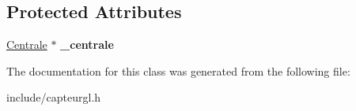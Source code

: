 \subsection*{Protected Attributes}
\begin{DoxyCompactItemize}
\item 
\hypertarget{class_capteur_g_l_af04faf3b9a6f9f005edce4efa744ea61}{\hyperlink{class_centrale}{Centrale} $\ast$ {\bfseries \-\_\-centrale}}\label{class_capteur_g_l_af04faf3b9a6f9f005edce4efa744ea61}

\end{DoxyCompactItemize}


The documentation for this class was generated from the following file\-:\begin{DoxyCompactItemize}
\item 
include/capteurgl.\-h\end{DoxyCompactItemize}
